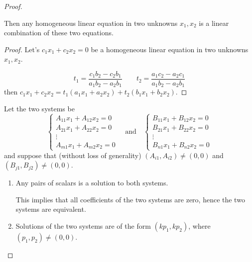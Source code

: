 \begin{proof}
\begin{lemma}
		Then any homogeneous linear equation in two unknowns $x_{1}, x_{2}$ is a linear combination of these two equations.
	\end{lemma}
	\begin{proof}
		Let's $c_{1}x_{1} + c_{2}x_{2} = 0$ be a homogeneous linear equation in two unknowns $x_{1}, x_{2}$.

		\[
			t_{1} = \frac{c_{1}b_{2} - c_{2}b_{1}}{a_{1}b_{2} - a_{2}b_{1}}\qquad t_{2} = \frac{a_{1}c_{2} - a_{2}c_{1}}{a_{1}b_{2} - a_{2}b_{1}}
		\]
		then $c_{1}x_{1} + c_{2}x_{2} = t_{1}(a_{1}x_{1} + a_{2}x_{2}) + t_{2}(b_{1}x_{1} + b_{2}x_{2})$.
	\end{proof}

	Let the two systems be
	\[
		\begin{cases}
			A_{11}x_{1} + A_{12}x_{2} = 0 \\
			A_{21}x_{1} + A_{22}x_{2} = 0 \\
			\vdots                        \\
			A_{m1}x_{1} + A_{m2}x_{2} = 0
		\end{cases}
		\quad\text{and}\quad
		\begin{cases}
			B_{11}x_{1} + B_{12}x_{2} = 0 \\
			B_{21}x_{1} + B_{22}x_{2} = 0 \\
			\vdots                        \\
			B_{n1}x_{1} + B_{n2}x_{2} = 0
		\end{cases}
	\]
	and suppose that (without loss of generality) $(A_{i1}, A_{i2})\ne (0, 0)$ and $(B_{j1}, B_{j2})\ne (0, 0)$.

	\begin{enumerate}[label = \textbf{Case \arabic*.}, itemindent=1cm]
		\item Any pairs of scalars is a solution to both systems.

		      This implies that all coefficients of the two systems are zero, hence the two systems are equivalent.
		\item Solutions of the two systems are of the form $(kp_{1}, kp_{2})$, where $(p_{1}, p_{2})\ne (0, 0)$.


\end{enumerate}
\end{proof}
